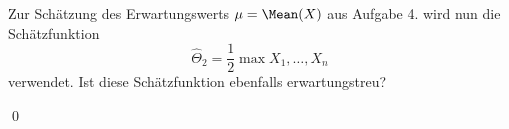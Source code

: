 \documentclass{abgabe}
\begin{document}
\begin{questions}
    \question
    Zur Schätzung des Erwartungswerts $\mu = \Mean(X)$ aus Aufgabe 4. wird nun die Schätzfunktion
    \[ 
        \hat{\Theta}_2 = \frac{1}{2} \max{X_1, \ldots, X_n}
    \]
    verwendet. 
    Ist diese Schätzfunktion ebenfalls erwartungstreu?
    \begin{solution}

        \qed
    \end{solution}
\end{questions}
\end{document}
